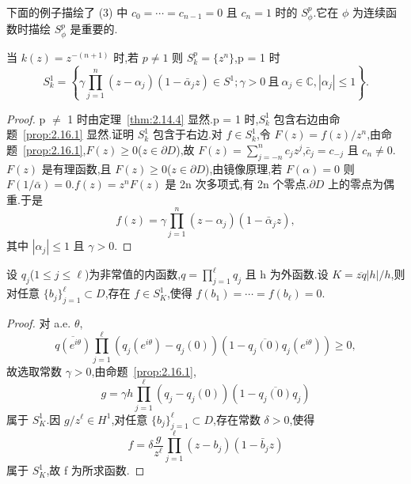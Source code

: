 下面的例子描绘了 (3) 中 $c_{0} = \cdots = c_{n-1} = 0$ 且 $c_{n} = 1$ 时的 $S_{\phi}^{p}$.它在 $\phi$ 为连续函数时描绘 $S_{\phi}^{p}$ 是重要的.

\begin{example}\label{exa:2.16.3}
当 $k(z) = z^{-(n+1)}$ 时,若 $p \neq 1$ 则 $S_{k}^{p} = \{z^{n}\}$,p = 1 时
\begin{equation*}
S_{k}^{1} = \left\{\gamma \prod_{j=1}^{n} (z - \alpha_{j})(1 - \bar{\alpha}_{j}z) \in S^{1}; \gamma > 0 \ \text{且} \ \alpha_{j} \in \mathbb{C}, |\alpha_{j}| \leq 1 \right\}.
\end{equation*}
\end{example}

\begin{proof}
p $\neq$ 1 时由定理~\ref{thm:2.14.4} 显然.p = 1 时,$S_{k}^{1}$ 包含右边由命题~\ref{prop:2.16.1} 显然.证明 $S_{k}^{1}$ 包含于右边.对 $f \in S_{k}^{1}$,令 $F(z) = f(z)/z^{n}$,由命题~\ref{prop:2.16.1},$F(z) \geq 0$($z \in \partial D$),故 $F(z) = \sum_{j=-n}^{n} c_{j}z^{j}$,$\bar{c}_{j} = c_{-j}$ 且 $c_{n} \neq 0$.$F(z)$ 是有理函数,且 $F(z) \geq 0$($z \in \partial D$),由镜像原理,若 $F(\alpha) = 0$ 则 $F(1/\bar{\alpha}) = 0$.$f(z) = z^{n}F(z)$ 是 2n 次多项式,有 2n 个零点.$\partial D$ 上的零点为偶重.于是
\begin{equation*}
f(z) = \gamma \prod_{j=1}^{n} (z - \alpha_{j})(1 - \bar{\alpha}_{j}z),
\end{equation*}
其中 $|\alpha_{j}| \leq 1$ 且 $\gamma > 0$.
\end{proof}

\begin{lemma}\label{lem:2.16.4}
设 $q_{j}$($1 \leq j \leq \ell$)为非常值的内函数,$q = \prod_{j=1}^{\ell} q_{j}$ 且 h 为外函数.设 $K = \overline{zq}|h|/h$,则对任意 $\{b_{j}\}_{j=1}^{\ell} \subset D$,存在 $f \in S_{K}^{1}$,使得 $f(b_{1}) = \cdots = f(b_{\ell}) = 0$.
\end{lemma}

\begin{proof}
对 a.e. $\theta$,
\begin{equation*}
\overline{q(e^{i\theta})}\prod_{j=1}^{\ell} (q_{j}(e^{i\theta}) - q_{j}(0))(1 - \overline{q_{j}(0)}q_{j}(e^{i\theta})) \geq 0,
\end{equation*}
故选取常数 $\gamma > 0$,由命题~\ref{prop:2.16.1},
\begin{equation*}
g = \gamma h\prod_{j=1}^{\ell} (q_{j} - q_{j}(0))(1 - \overline{q_{j}(0)}q_{j})
\end{equation*}
属于 $S_{K}^{1}$.因 $g/z^{\ell} \in H^{1}$,对任意 $\{b_{j}\}_{j=1}^{\ell} \subset D$,存在常数 $\delta > 0$,使得
\begin{equation*}
f = \delta \frac{g}{z^{\ell}}\prod_{j=1}^{\ell} (z - b_{j})(1 - \bar{b}_{j}z)
\end{equation*}
属于 $S_{K}^{1}$,故 f 为所求函数.
\end{proof}


